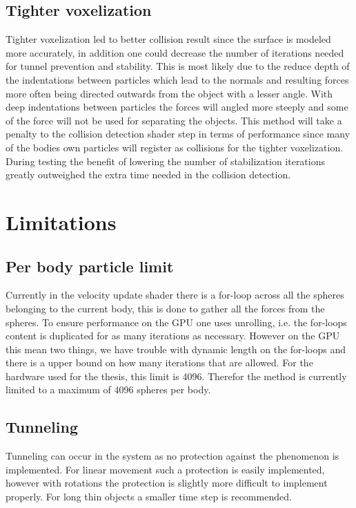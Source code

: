 \subsection{Tighter voxelization}
Tighter voxelization led to better collision result since the surface is modeled
more accurately, in addition one could decrease the number of iterations needed
for tunnel prevention and stability. This is most likely due to the reduce depth
of the indentations between particles which lead to the normals and resulting forces more often
being directed outwards from the object with a lesser angle.
 With deep indentations between particles the forces will angled more steeply and
  some of the force will not be used for separating the objects.
This method will take a penalty to the collision detection shader step in
terms of performance since many of the bodies own particles will register as collisions
for the tighter voxelization. During testing the benefit of lowering the number of
stabilization iterations greatly outweighed the extra time needed in the collision
detection.

\section{Limitations}
\subsection{Per body particle limit}
Currently in the velocity update shader there is a for-loop across all the spheres
belonging to the current body, this is done to gather all the forces from the spheres.
To ensure performance on the GPU one uses unrolling, i.e. the for-loops content is
duplicated for as many iterations as necessary. However on the GPU this mean two
things, we have trouble with dynamic length on the for-loops and there is a upper
bound on how many iterations that are allowed. For the hardware used for the thesis,
this limit is 4096. Therefor the method is currently limited to a maximum of 4096
spheres per body.

\subsection{Tunneling}
Tunneling can occur in the system as no protection against the phenomenon is implemented.
For linear movement such a protection is easily implemented, however with rotations
the protection is slightly more difficult to implement properly. For long thin
objects a smaller time step is recommended.
